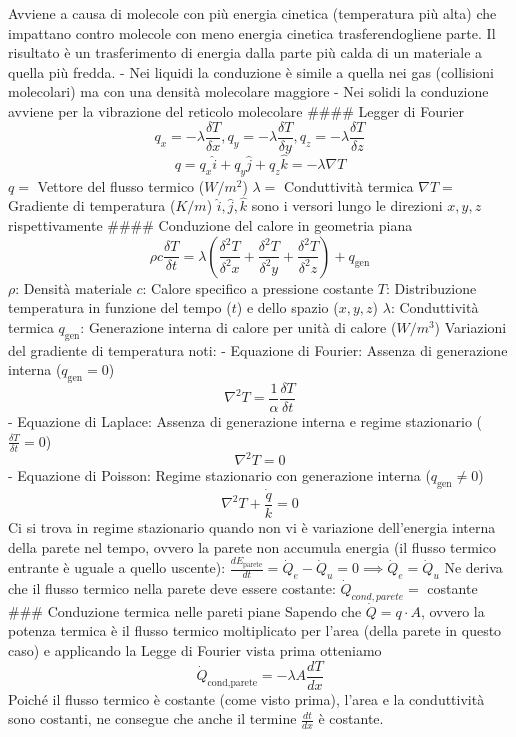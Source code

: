 Avviene a causa di molecole con più energia cinetica (temperatura più
alta) che impattano contro molecole con meno energia cinetica
trasferendogliene parte. Il risultato è un trasferimento di energia
dalla parte più calda di un materiale a quella più fredda. - Nei liquidi
la conduzione è simile a quella nei gas (collisioni molecolari) ma con
una densità molecolare maggiore - Nei solidi la conduzione avviene per
la vibrazione del reticolo molecolare \#\#\#\# Legger di Fourier
\[q_x=-\lambda\frac{\delta T}{\delta x}, q_y=-\lambda\frac{\delta T}{\delta y}, q_z=-\lambda\frac{\delta T}{\delta z}\]
\[q = q_x\hat i+q_y\hat j + q_z\hat k =-\lambda\nabla T\] \(q=\) Vettore
del flusso termico (\(W/m^2\)) \(\lambda =\) Conduttività termica
\(\nabla T=\) Gradiente di temperatura (\(K/m\))
\(\hat i, \hat j, \hat k\) sono i versori lungo le direzioni \(x,y,z\)
rispettivamente \#\#\#\# Conduzione del calore in geometria piana
\[\rho c\frac{\delta T}{\delta t}=\lambda \left(\frac{\delta^2T}{\delta^2x}+\frac{\delta^2T}{\delta^2y}+\frac{\delta^2T}{\delta^2z}\right)+q_{\text{gen}}\]
\(\rho\): Densità materiale \(c\): Calore specifico a pressione costante
\(T\): Distribuzione temperatura in funzione del tempo (\(t\)) e dello
spazio (\(x,y,z\)) \(\lambda\): Conduttività termica \(q_\text{gen}\):
Generazione interna di calore per unità di calore (\(W/m^3\)) Variazioni
del gradiente di temperatura noti: - Equazione di Fourier: Assenza di
generazione interna (\(q_\text{gen}=0\))
\[\nabla^2T=\frac{1}{\alpha}\frac{\delta T}{\delta t}\] - Equazione di
Laplace: Assenza di generazione interna e regime stazionario
(\(\frac{\delta T}{\delta t}=0\)) \[\nabla^2T = 0\] - Equazione di
Poisson: Regime stazionario con generazione interna
(\(q_\text{gen}\neq 0\)) \[\nabla^2T+\frac{\dot q}{k}=0\] Ci si trova in
regime stazionario quando non vi è variazione dell'energia interna della
parete nel tempo, ovvero la parete non accumula energia (il flusso
termico entrante è uguale a quello uscente):
\(\frac{dE_\text{parete}}{dt}=\dot Q_e - \dot Q_u=0\implies \dot Q_e=\dot Q_u\)
Ne deriva che il flusso termico nella parete deve essere costante:
\(\dot Q_{cond, parete}=\) costante \#\#\# Conduzione termica nelle
pareti piane Sapendo che \(\dot Q=q\cdot A\), ovvero la potenza termica
è il flusso termico moltiplicato per l'area (della parete in questo
caso) e applicando la Legge di Fourier vista prima otteniamo
\[\dot Q_\text{cond,parete}=-\lambda A\frac{dT}{dx}\]Poiché il flusso
termico è costante (come visto prima), l'area e la conduttività sono
costanti, ne consegue che anche il termine \(\frac{dt}{dx}\) è costante.
